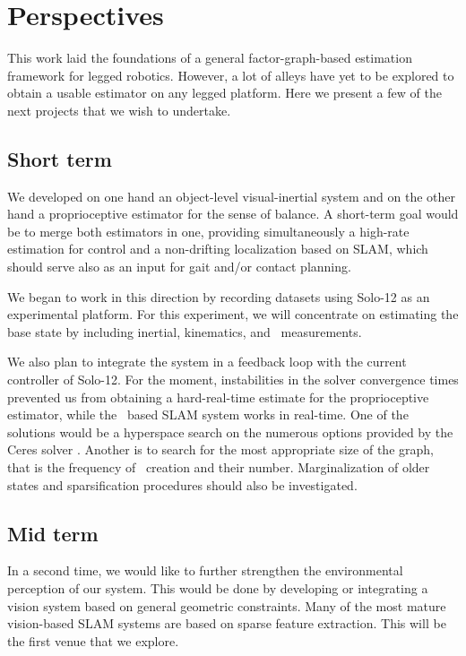 \section{Perspectives}
This work laid the foundations of a general factor-graph-based estimation framework for legged robotics. However, a lot of alleys have yet to be explored 
to obtain a usable estimator on any legged platform. Here we present a few of the next projects that we wish to undertake.

\subsection{Short term}
We developed on one hand an object-level visual-inertial system and on the other hand a proprioceptive estimator for the sense of balance. A short-term goal
would be to merge both estimators in one, providing simultaneously a high-rate estimation for control and a non-drifting localization based on SLAM, which should serve also as an input for gait and/or contact planning. 

We began to work in this direction by recording datasets using Solo-12 as an experimental platform. For this experiment, we will concentrate on estimating the 
base state by including inertial, kinematics, and \apriltag\ measurements. 

We also plan to integrate the system in a feedback loop with the current controller of Solo-12. For the moment, instabilities in the solver convergence times prevented
us from obtaining a hard-real-time estimate for the proprioceptive estimator, while the \apriltag\ based SLAM system works in real-time. One of the solutions would 
be a hyperspace search on the numerous options provided by the Ceres solver \cite{ceres-solver}. Another is to search for the most appropriate size of the graph,
that is the frequency of \keyframe\ creation and their number. Marginalization of older states and sparsification procedures should also be investigated.



\subsection{Mid term}

In a second time, we would like to further strengthen the environmental perception of our system. This would be done by developing or integrating a vision system
based on general geometric constraints. Many of the most mature vision-based SLAM systems are based on sparse feature extraction. This will be 
the first venue that we explore. 

